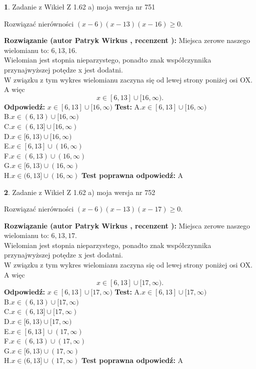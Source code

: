 \documentclass[12pt, a4paper]{article}
\theoremstyle{definition} %
\newtheorem{zad}{}
\newcommand{\zadStart}[1]{\begin{zad}#1\newline}
\newcommand{\zadStop}{\end{zad}}
\newcommand{\rozwStart}[2]{\noindent \textbf{Rozwiązanie (autor #1 , recenzent #2): }\newline}
\newcommand{\rozwStop}{\newline}
\newcommand{\odpStart}{\noindent \textbf{Odpowiedź:}\newline}
\newcommand{\odpStop}{\newline}
\newcommand{\testStart}{\noindent \textbf{Test:}\newline}
\newcommand{\testStop}{\newline}
\newcommand{\kluczStart}{\noindent \textbf{Test poprawna odpowiedź:}\newline}
\newcommand{\kluczStop}{\newline}
\begin{document}
\zadStart{Zadanie z Wikieł Z 1.62 a) moja wersja nr 751}

Rozwiązać nierówności $(x-6)(x-13)(x-16)\ge0$.
\zadStop
\rozwStart{Patryk Wirkus}{}
Miejsca zerowe naszego wielomianu to: $6, 13, 16$.\\
Wielomian jest stopnia nieparzystego, ponadto znak współczynnika przy\linebreak najwyższej potędze x jest dodatni.\\ W związku z tym wykres wielomianu zaczyna się od lewej strony poniżej osi OX. A więc $$x \in [6,13] \cup [16,\infty).$$
\rozwStop
\odpStart
$x \in [6,13] \cup [16,\infty)$
\odpStop
\testStart
A.$x \in [6,13] \cup [16,\infty)$\\
B.$x \in (6,13) \cup [16,\infty)$\\
C.$x \in (6,13] \cup [16,\infty)$\\
D.$x \in [6,13) \cup [16,\infty)$\\
E.$x \in [6,13] \cup (16,\infty)$\\
F.$x \in (6,13) \cup (16,\infty)$\\
G.$x \in [6,13) \cup (16,\infty)$\\
H.$x \in (6,13] \cup (16,\infty)$
\testStop
\kluczStart
A
\kluczStop



\zadStart{Zadanie z Wikieł Z 1.62 a) moja wersja nr 752}

Rozwiązać nierówności $(x-6)(x-13)(x-17)\ge0$.
\zadStop
\rozwStart{Patryk Wirkus}{}
Miejsca zerowe naszego wielomianu to: $6, 13, 17$.\\
Wielomian jest stopnia nieparzystego, ponadto znak współczynnika przy\linebreak najwyższej potędze x jest dodatni.\\ W związku z tym wykres wielomianu zaczyna się od lewej strony poniżej osi OX. A więc $$x \in [6,13] \cup [17,\infty).$$
\rozwStop
\odpStart
$x \in [6,13] \cup [17,\infty)$
\odpStop
\testStart
A.$x \in [6,13] \cup [17,\infty)$\\
B.$x \in (6,13) \cup [17,\infty)$\\
C.$x \in (6,13] \cup [17,\infty)$\\
D.$x \in [6,13) \cup [17,\infty)$\\
E.$x \in [6,13] \cup (17,\infty)$\\
F.$x \in (6,13) \cup (17,\infty)$\\
G.$x \in [6,13) \cup (17,\infty)$\\
H.$x \in (6,13] \cup (17,\infty)$
\testStop
\kluczStart
A
\kluczStop
\end{document}
